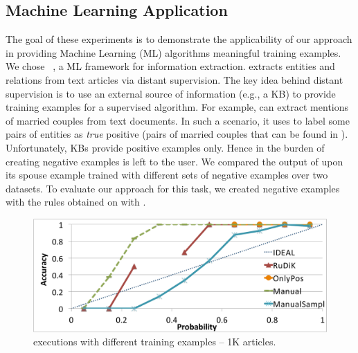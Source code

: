 \subsection{Machine Learning Application} \label{sec:krd_deep_dive}
\vspace{-1ex}
The goal of these experiments is to demonstrate the applicability of our approach in providing Machine Learning (ML) algorithms meaningful training examples.
We chose \deepdive~\cite{shin2015incremental}, a ML framework for information extraction. \deepdive extracts entities and relations from text articles via distant supervision. The key idea behind distant supervision is to use an external source of information (e.g., a KB) to provide training examples for a supervised algorithm. For example, \deepdive can extract mentions of married couples from text documents. In such a scenario, it uses %
\dbpedia to label some pairs of entities as \emph{true} positive (pairs of married couples that can be found in \dbpedia). 
Unfortunately, KBs provide positive examples only. Hence in \deepdive the burden of creating negative examples is left to the user. %
We compared the output of \deepdive upon its spouse example trained with different sets of negative examples over two datasets. To evaluate our approach for this task, we created negative examples with the rules obtained on \dbpedia with \krd. 

\begin{figure}[htb]
	\centering
	\vspace{1ex}
	\includegraphics[width=.95\columnwidth]{include/figure/deepDive1K.pdf}
	\vspace{-1ex}
	\caption{\deepdive executions with different training examples -- 1K articles.}
	\label{fig:deep_dive_1k}
\end{figure}


